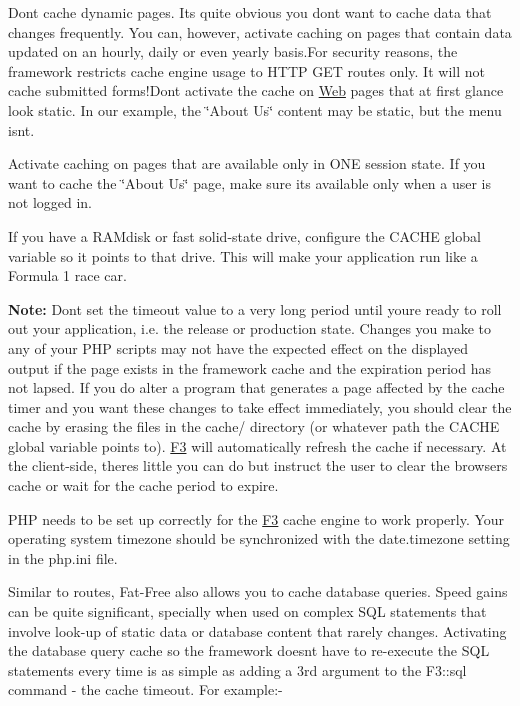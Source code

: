 \begin{DoxyItemize}
\item Don\textquotesingle{}t cache dynamic pages. It\textquotesingle{}s quite obvious you don\textquotesingle{}t want to cache data that changes frequently. You can, however, activate caching on pages that contain data updated on an hourly, daily or even yearly basis.\+For security reasons, the framework restricts cache engine usage to H\+T\+TP {\ttfamily G\+ET} routes only. It will not cache submitted forms!\+Don\textquotesingle{}t activate the cache on \hyperlink{class_web}{Web} pages that at first glance look static. In our example, the \char`\"{}\+About Us\char`\"{} content may be static, but the menu isn\textquotesingle{}t.
\item Activate caching on pages that are available only in O\+NE session state. If you want to cache the {\ttfamily \char`\"{}\+About Us\char`\"{}} page, make sure it\textquotesingle{}s available only when a user is not logged in.
\item If you have a R\+A\+Mdisk or fast solid-\/state drive, configure the {\ttfamily C\+A\+C\+HE} global variable so it points to that drive. This will make your application run like a Formula 1 race car.
\end{DoxyItemize}

{\bfseries Note\+:} Don\textquotesingle{}t set the timeout value to a very long period until you\textquotesingle{}re ready to roll out your application, i.\+e. the release or production state. Changes you make to any of your P\+HP scripts may not have the expected effect on the displayed output if the page exists in the framework cache and the expiration period has not lapsed. If you do alter a program that generates a page affected by the cache timer and you want these changes to take effect immediately, you should clear the cache by erasing the files in the cache/ directory (or whatever path the {\ttfamily C\+A\+C\+HE} global variable points to). \hyperlink{class_f3}{F3} will automatically refresh the cache if necessary. At the client-\/side, there\textquotesingle{}s little you can do but instruct the user to clear the browser\textquotesingle{}s cache or wait for the cache period to expire.

P\+HP needs to be set up correctly for the \hyperlink{class_f3}{F3} cache engine to work properly. Your operating system timezone should be synchronized with the date.\+timezone setting in the {\ttfamily php.\+ini} file.

Similar to routes, Fat-\/\+Free also allows you to cache database queries. Speed gains can be quite significant, specially when used on complex S\+QL statements that involve look-\/up of static data or database content that rarely changes. Activating the database query cache so the framework doesn\textquotesingle{}t have to re-\/execute the S\+QL statements every time is as simple as adding a 3rd argument to the F3\+::sql command -\/ the cache timeout. For example\+:-\/


